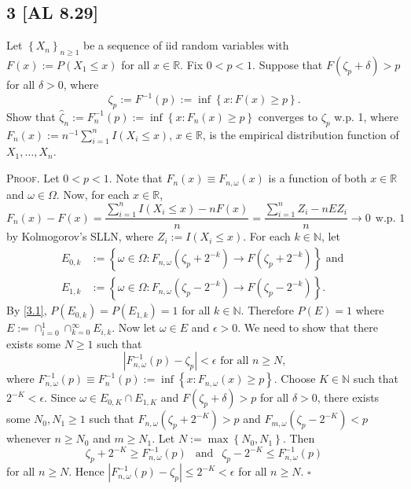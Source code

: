 \documentclass[12pt]{article}
\newcounter{ProofCounter}
\newenvironment{Proof}{\stepcounter{ProofCounter}\textsc{Proof.}}{\hfill$\square$}
\begin{document}
\subsection*{3 [AL 8.29]}
\begin{tcolorbox}
Let $\left\{ X_{n} \right\}_{n\geq 1}$ be a sequence of iid random variables with $F(x) := P(X_{1} \leq x)$ for all $x \in \mathbb{R}$. Fix $0 < p <
1$. Suppose that $F(\zeta_{p} + \delta) > p$ for all $\delta> 0$, where 
\[ \zeta_p := F^{-1}(p) := \inf\left\{ x : F(x) \geq p \right\}. \]
Show that $\hat{\zeta}_{n} := F_{n}^{-1}(p) := \inf\left\{ x : F_{n}(x) \geq p \right\}$ converges to $\zeta_{p}$ w.p. 1, where $F_{n}(x) :=
n^{-1}\sum_{i=1}^{n}I(X_{i} \leq x)$, $x \in \mathbb{R}$, is the empirical distribution function of $X_{1}, \hdots, X_{n}$.
\end{tcolorbox}
\begin{Proof}
Let $0 < p < 1$. Note that $F_{n}(x) \equiv F_{n,\omega}(x)$ is a function of both $x \in \mathbb{R}$ and $\omega \in \Omega$. Now, for each $x \in
\mathbb{R}$,
\begin{equation}
F_{n}(x) - F(x) = \frac{\sum_{i=1}^{n}I(X_{i} \leq x) - nF(x)}{n} = \frac{\sum_{i=1}^{n}Z_{i} - nEZ_{i}}{n} \rightarrow 0 \ \ \text{w.p. 1} 
\label{3.1}
\end{equation}
by Kolmogorov's SLLN, where $Z_{i} := I(X_{i} \leq x)$. For each $k \in \mathbb{N}$, let 
\begin{align*}
E_{0,k} & := \left\{ \omega \in \Omega : F_{n,\omega}(\zeta_{p} + 2^{-k}) \rightarrow F(\zeta_{p} + 2^{-k}) \right\} \text{ and } \\
E_{1,k} & := \left\{ \omega \in \Omega : F_{n,\omega}(\zeta_{p} - 2^{-k}) \rightarrow F(\zeta_{p}-2^{-k})\right\}.
\end{align*}
By \eqref{3.1}, $P(E_{0,k}) = P(E_{1,k}) = 1$ for all $k \in \mathbb{N}$. Therefore $P(E) = 1$ where $E := \cap_{i=0}^{1}\cap_{k=0}^{\infty}E_{i,k}$.
Now let $\omega \in E$ and $\epsilon > 0$. We need to show that there exists some $N \geq 1$ such that 
\[ |F_{n,\omega}^{-1}(p) - \zeta_p| < \epsilon \text{ for all $n \geq N$,} \]
where $F_{n,\omega}^{-1}(p) \equiv F_{n}^{-1}(p) := \inf\left\{ x : F_{n,\omega}(x) \geq p \right\}$.
Choose $K \in \mathbb{N}$ such that $2^{-K} < \epsilon$. Since $\omega \in E_{0,K}\cap E_{1,K}$ and $F(\zeta_{p} + \delta) > p$ for all $\delta
> 0$, there exists some $N_{0}, N_{1} \geq 1$ such that 
$F_{n,\omega}(\zeta_{p} + 2^{-K}) > p$ and $F_{m,\omega}(\zeta_p - 2^{-K}) < p$ whenever $n \geq N_{0}$ and $m \geq N_{1}$. Let $N := \max\left\{
N_{0}, N_{1} \right\}$.
Then 
\[ \zeta_p + 2^{-K} \geq F_{n,\omega}^{-1}(p)\  \ \text{ and }\ \ \zeta_p - 2^{-K} \leq F_{n,\omega}^{-1}(p) \] 
for all $n \geq N$. Hence $|F_{n,\omega}^{-1}(p) - \zeta_p| \leq 2^{-K} < \epsilon$ for all $n \geq N$.
\end{Proof}
\end{document}
